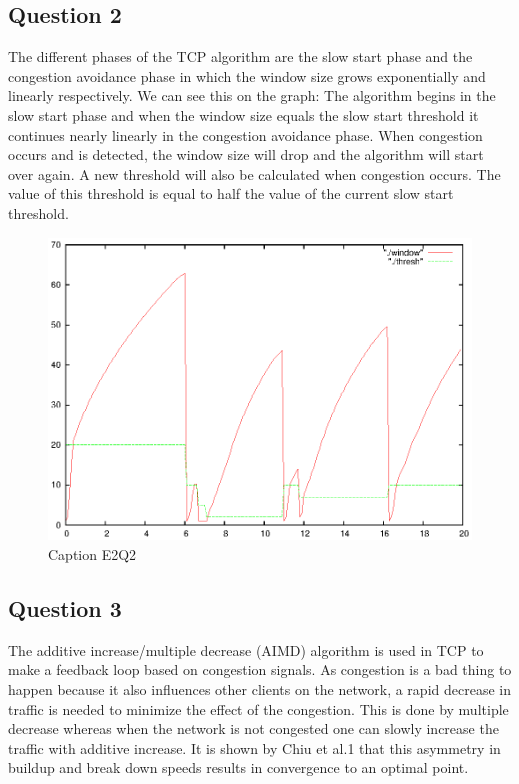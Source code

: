 \documentclass[12pt]{article}
\begin{document}
\subsection*{Question 2}
The different phases of the TCP algorithm are the slow start phase and the congestion avoidance phase in which the window size grows exponentially and linearly respectively. We can see this on the graph: The algorithm begins in the slow start phase and when the window size equals the slow start threshold it continues nearly linearly in the congestion avoidance phase. When congestion occurs and is detected, the window size will drop and the algorithm will start over again. A new threshold will also be calculated when congestion occurs. The value of this threshold is equal to half the value of the current slow start threshold.
\begin{figure}[h]
\centerline{\includegraphics{pictures/E2Q2.eps}}
\caption{Caption E2Q2}
\label{ex2:question2}
\end{figure}

\subsection*{Question 3}
The additive increase/multiple decrease (AIMD) algorithm is used in TCP to make a feedback loop based on congestion signals. As congestion is a bad thing to happen because it also influences other clients on the network, a rapid decrease in traffic is needed to minimize the effect of the congestion. This is done by multiple decrease whereas when the network is not congested one can slowly increase the traffic with additive increase. It is shown by Chiu et al.1 that this asymmetry in buildup and break down speeds results in convergence to an optimal point.
\end{document}
